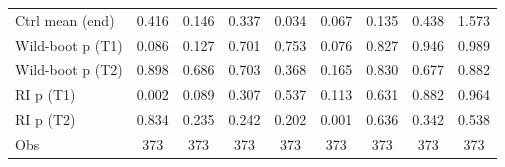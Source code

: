 {\begin{tabular}{l*{8}{c}}
Ctrl mean (end)     &       0.416         &       0.146         &       0.337         &       0.034         &       0.067         &       0.135         &       0.438         &       1.573         \\
Wild-boot p (T1)    &       0.086         &       0.127         &       0.701         &       0.753         &       0.076         &       0.827         &       0.946         &       0.989         \\
Wild-boot p (T2)    &       0.898         &       0.686         &       0.703         &       0.368         &       0.165         &       0.830         &       0.677         &       0.882         \\
RI p (T1)           &       0.002         &       0.089         &       0.307         &       0.537         &       0.113         &       0.631         &       0.882         &       0.964         \\
RI p (T2)           &       0.834         &       0.235         &       0.242         &       0.202         &       0.001         &       0.636         &       0.342         &       0.538         \\
Obs                 &         373         &         373         &         373         &         373         &         373         &         373         &         373         &         373         \\
\bottomrule
\end{tabular}
}
